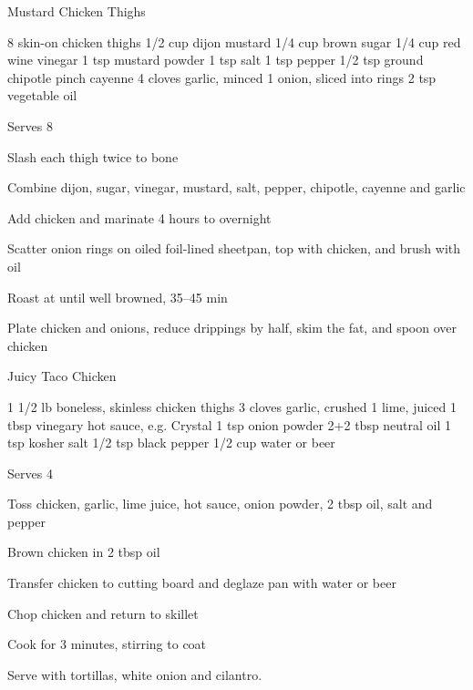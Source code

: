 \begin{denserecipe}{Mustard Chicken Thighs}{}
\begin{ingredients}
8 skin-on chicken thighs
1/2 cup dijon mustard
1/4 cup brown sugar
1/4 cup red wine vinegar
1 tsp mustard powder
1 tsp salt
1 tsp pepper
1/2 tsp ground chipotle
pinch cayenne
4 cloves garlic, minced
1 onion, sliced into rings
2 tsp vegetable oil
\end{ingredients}
\nextcolumn
Serves 8
\begin{steps}
    \item Slash each thigh twice to bone
    \item Combine dijon, sugar, vinegar, mustard, salt, pepper, chipotle, cayenne and garlic
    \item Add chicken and marinate 4 hours to overnight
    \item Scatter onion rings on oiled foil-lined sheetpan, top with chicken, and brush with oil
    \item Roast at  until well browned, 35--45 min
    \item Plate chicken and onions, reduce drippings by half, skim the fat, and spoon over chicken
\end{steps}
\end{denserecipe}

\begin{recipe}{Juicy Taco Chicken}{}
\begin{ingredients}
1 1/2 lb boneless, skinless chicken thighs
3 cloves garlic, crushed
1 lime, juiced
1 tbsp vinegary hot sauce, e.g. Crystal
1 tsp onion powder
2+2 tbsp neutral oil
1 tsp kosher salt
1/2 tsp black pepper
1/2 cup water or beer
\end{ingredients}
\nextcolumn
Serves 4
\begin{steps}
    \item Toss chicken, garlic, lime juice, hot sauce, onion powder, 2 tbsp oil, salt and pepper
    \item Brown chicken in 2 tbsp oil
    \item Transfer chicken to cutting board and deglaze pan with water or beer
    \item Chop chicken and return to skillet
    \item Cook for 3 minutes, stirring to coat
\end{steps}
Serve with tortillas, white onion and cilantro.
\end{recipe}

